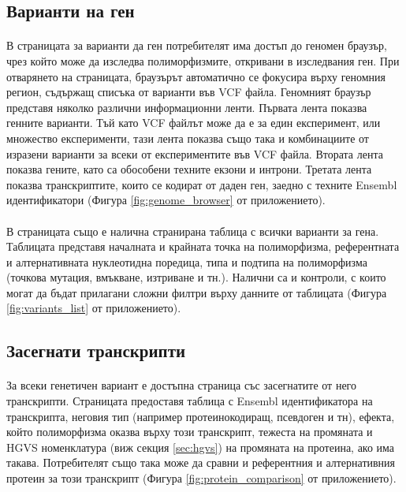 \documentclass[pdftex,cyrillic,14pt,a4page,twoside,openright]{extreport}
\begin{document}
\subsection{Варианти на ген}
\paragraph{}
В страницата за варианти да ген потребителят има достъп до геномен браузър, чрез който може да изследва полиморфизмите, откривани в изследвания ген. При отварянето на страницата, браузърът автоматично се фокусира върху геномния регион, съдържащ списъка от варианти във VCF файла. Геномният браузър представя няколко различни информационни ленти. Първата лента показва генните варианти. Тъй като VCF файлът може да е за един експеримент, или множество експерименти, тази лента показва също така и комбинациите от изразени варианти за всеки от експериментите във VCF файла. Втората лента показва гените, като са обособени техните екзони и интрони. Третата лента показва транскриптите, които се кодират от даден ген, заедно с техните Ensembl идентификатори (Фигура \ref{fig:genome_browser} от приложението).

\paragraph{}
В страницата също е налична странирана таблица с всички варианти за гена. Таблицата представя началната и крайната точка на полиморфизма, референтната и алтернативната нуклеотидна поредица, типа и подтипа на полиморфизма (точкова мутация, вмъкване, изтриване и тн.). Налични са и контроли, с които могат да бъдат прилагани сложни филтри върху данните от таблицата (Фигура \ref{fig:variants_list} от приложението).

\subsection{Засегнати транскрипти}\label{sec:affected_transcripts}
\paragraph{}
За всеки генетичен вариант е достъпна страница със засегнатите от него транскрипти. Страницата предоставя таблица с Ensembl идентификатора на транскрипта, неговия тип (например протеинокодиращ, псевдоген и тн), ефекта, който полиморфизма оказва върху този транскрипт, тежеста на промяната и HGVS номенклатура (виж секция \ref{sec:hgvs}) на промяната на протеина, ако има такава. Потребителят също така може да сравни и референтния и алтернативния протеин за този транскрипт (Фигура \ref{fig:protein_comparison} от приложението).
\end{document}
